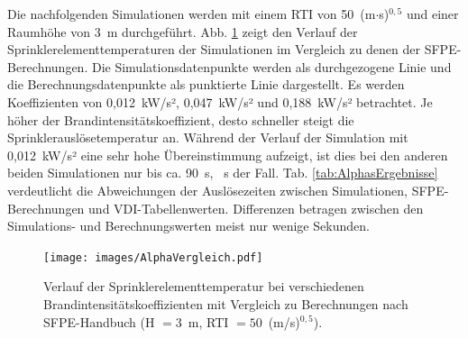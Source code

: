 Die nachfolgenden Simulationen werden mit einem RTI von 50~(m$\cdot$s)$^{0,5}$ und einer Raumhöhe von 3~m durchgeführt. Abb. \ref{fig:AlphaVergleich} zeigt den Verlauf der Sprinklerelementtemperaturen der Simulationen im Vergleich zu denen der SFPE-Berechnungen.
Die Simulationsdatenpunkte werden als durchgezogene Linie und die Berechnungsdatenpunkte als punktierte Linie dargestellt. Es werden Koeffizienten von 0,012~kW/s², 0,047~kW/s² und  0,188~kW/s² betrachtet. Je höher der Brandintensitätskoeffizient, desto schneller steigt die Sprinklerauslösetemperatur an.
Während der Verlauf der Simulation mit 0,012~kW/s² eine sehr hohe Übereinstimmung aufzeigt, ist dies bei den anderen beiden Simulationen nur bis ca. 90~s, ~s der Fall. Tab. \ref{tab:AlphasErgebnisse} verdeutlicht die Abweichungen der Auslösezeiten zwischen Simulationen, SFPE-Berechnungen und VDI-Tabellenwerten. Differenzen betragen zwischen den Simulations- und Berechnungswerten meist nur wenige Sekunden.
\begin{figure}[h]
    \centering
    \texttt{[image: images/AlphaVergleich.pdf]}
    \caption{Verlauf der Sprinklerelementtemperatur bei verschiedenen Brand\-in\-ten\-si\-täts\-ko\-ef\-fi\-zien\-ten mit Vergleich zu Berechnungen nach SFPE-Handbuch (H $=3$~m, RTI $=50$~(m/s)$^{0,5}$).}
    \label{fig:AlphaVergleich}
\end{figure}
